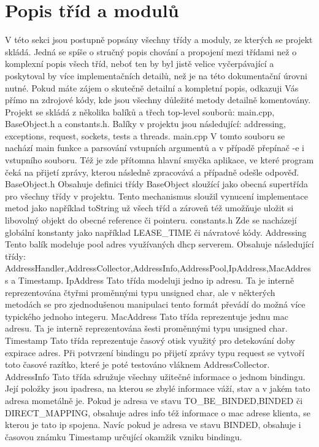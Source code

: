 \documentclass[12pt,a4paper]{report}
\begin{document}
\chapter{Popis tříd a modulů}
V této sekci jsou postupně popsány všechny třídy a moduly, ze kterých se projekt skládá.  Jedná se spíše o stručný popis chování a propojení mezi třídami než o komplexní popis všech tříd, neboť ten by byl jistě velice vyčerpávající a poskytoval by více implementačních detailů, než je na této dokumentační úrovni nutné. Pokud máte zájem o skutečně detailní a kompletní popis, odkazuji Vás přímo na zdrojové kódy, kde jsou všechny důležité metody detailně komentovány. 
Projekt se skládá z několika balíků a třech top-level  souborů: main.cpp, BaseObject.h a constants.h.
Balíky v projektu jsou následující: addressing, exceptions, request, sockets, tests a threads. 
main.cpp
V tomto souboru se nachází main funkce a parsování vstupních argumentů a v případě přepínač -e i vstupního souboru. Též je zde přítomna hlavní smyčka aplikace, ve které program čeká na přijetí zprávy, kterou následně zpracovává a případně odešle odpověď.
BaseObject.h
Obsahuje definici třídy BaseObject sloužící jako obecná supertřída pro všechny třídy v projektu. Tento mechanismus sloužil vynucení implementace metod jako například toString už všech tříd a zároveň též umožňuje uložit si libovolný objekt do obecné reference či pointeru.
constants.h
Zde se nacházejí globální konstanty jako například LEASE\_TIME či návratové kódy.
Addressing
Tento balík modeluje pool adres využívaných dhcp serverem. Obsahuje následující třídy: AddressHandler,AddressCollector,AddressInfo,AddressPool,IpAddress,MacAddress a Timestamp.
IpAddress
	Tato třída modeluji jedno ip adresu. Ta je interně reprezentována čtyřmi proměnnými typu unsigned char, ale v některých metodách se pro zjednodušenou manipulaci tento formát převádí do možná více typického jednoho integeru.
MacAddress
	Tato třída reprezentuje jednu mac adresu. Ta je interně reprezentována šesti proměnnými typu unsigned char. 
Timestamp
	Tato třída reprezentuje časový otisk využitý pro detekování doby expirace adres. Při potvrzení bindingu po přijetí zprávy typu request se vytvoří toto časové razítko, které je poté testováno vláknem AddressCollector. 
AddressInfo
	Tato třída sdružuje všechny užitečné informace o jednom bindingu. Její položky jsou ipadresa, na kterou se zbylé informace váží, stav a v jakém tato adresa mometálně je. Pokud je adresa ve stavu TO\_BE\_BINDED,BINDED či DIRECT\_MAPPING, obsahuje adres info též informace o mac adrese klienta, se kterou je tato ip spojena. Navíc pokud je adresa ve stavu BINDED, obsahuje i časovou známku Timestamp určující okamžik vzniku bindingu.
\end{document}
